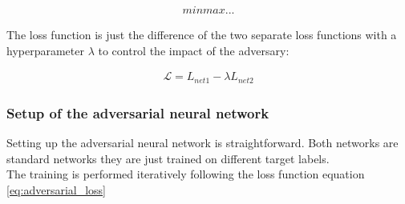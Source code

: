 \begin{align}
    minmax...
\end{align}

The loss function is just the difference of the two separate loss functions with a hyperparameter $\lambda$ to control the impact of the adversary:

\begin{align}
    \mathcal{L} = L_{net1} - \lambda L_{net2}
    \label{eq:adversarial_loss}
\end{align}


\subsubsection{Setup of the adversarial neural network}

Setting up the adversarial neural network is straightforward. Both networks are standard networks they are just trained on different target labels.\\
The training is performed iteratively following the loss function equation \eqref{eq:adversarial_loss}

